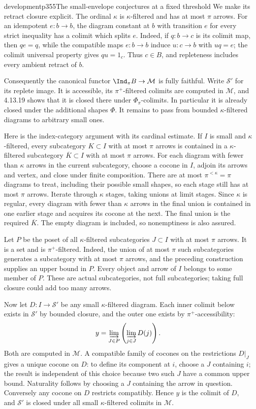 \begin{dcomment}{development}{p355}{The small-envelope conjectures at a fixed threshold}
We make its retract closure explicit. The ordinal $\kappa$ is $\kappa$-filtered and has at most $\pi$ arrows. For an idempotent $e:b\to b$, the diagram constant at $b$ with transition $e$ for every strict inequality has a colimit which splits $e$. Indeed, if $q:b\to c$ is its colimit map, then $qe=q$, while the compatible maps $e:b\to b$ induce $u:c\to b$ with $uq=e$; the colimit universal property gives $qu=1_c$. Thus $c\in B$, and repleteness includes every ambient retract of $b$.

Consequently the canonical functor $\Ind_\pi B\to\mathcal M$ is fully faithful. Write $\mathcal S'$ for its replete image. It is accessible, its $\pi^+$-filtered colimits are computed in $\mathcal M$, and 4.13.19 shows that it is closed there under $\Phi_\pi$-colimits. In particular it is already closed under the additional shapes $\Phi$. It remains to pass from bounded $\kappa$-filtered diagrams to arbitrary small ones.

Here is the index-category argument with its cardinal estimate. If $I$ is small and $\kappa$-filtered, every subcategory $K\subset I$ with at most $\pi$ arrows is contained in a $\kappa$-filtered subcategory $\overline K\subset I$ with at most $\pi$ arrows. For each diagram with fewer than $\kappa$ arrows in the current subcategory, choose a cocone in $I$, adjoin its arrows and vertex, and close under finite composition. There are at most $\pi^{<\kappa}=\pi$ diagrams to treat, including their possible small shapes, so each stage still has at most $\pi$ arrows. Iterate through $\kappa$ stages, taking unions at limit stages. Since $\kappa$ is regular, every diagram with fewer than $\kappa$ arrows in the final union is contained in one earlier stage and acquires its cocone at the next. The final union is the required $\overline K$. The empty diagram is included, so nonemptiness is also assured.

Let $P$ be the poset of all $\kappa$-filtered subcategories $J\subset I$ with at most $\pi$ arrows. It is a set and is $\pi^+$-filtered. Indeed, the union of at most $\pi$ such subcategories generates a subcategory with at most $\pi$ arrows, and the preceding construction supplies an upper bound in $P$. Every object and arrow of $I$ belongs to some member of $P$. These are actual subcategories, not full subcategories; taking full closure could add too many arrows.

Now let $D:I\to\mathcal S'$ be any small $\kappa$-filtered diagram. Each inner colimit below exists in $\mathcal S'$ by bounded closure, and the outer one exists by $\pi^+$-accessibility:
\[
 y=\varinjlim_{J\in P}\left(\varinjlim_{j\in J}D(j)\right).
\]
Both are computed in $\mathcal M$. A compatible family of cocones on the restrictions $D|_J$ gives a unique cocone on $D$: to define its component at $i$, choose a $J$ containing $i$; the result is independent of this choice because two such $J$ have a common upper bound. Naturality follows by choosing a $J$ containing the arrow in question. Conversely any cocone on $D$ restricts compatibly. Hence $y$ is the colimit of $D$, and $\mathcal S'$ is closed under all small $\kappa$-filtered colimits in $\mathcal M$.


\end{dcomment}
